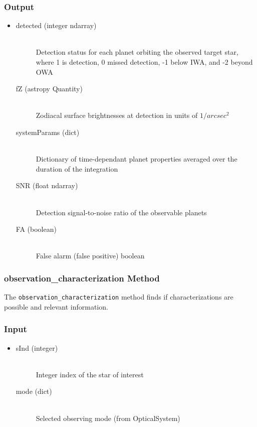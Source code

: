 \documentclass[cleanfoot]{asme2ej}
\begin{document}
\subsubsection*{Output}
\begin{itemize}
\item 
\begin{description}
    \item[detected (integer ndarray)] \hfill \\ Detection status for each planet orbiting the observed target star, where 1 is detection, 0 missed detection, -1 below IWA, and -2 beyond OWA
    \item[fZ (astropy Quantity)] \hfill \\ Zodiacal surface brightnesses at detection in units of $1/arcsec^2$
    \item[systemParams (dict)] \hfill \\ Dictionary of time-dependant planet properties averaged over the duration of the integration
    \item[SNR (float ndarray)] \hfill \\ Detection signal-to-noise ratio of the observable planets
    \item[FA (boolean)] \hfill \\ False alarm (false positive) boolean
\end{description}
\end{itemize}

\subsubsection{observation\_characterization Method} \label{sec:observationcharacterizationtask}
The \verb+observation_characterization+ method finds if characterizations are possible and relevant information.

\subsubsection*{Input}
\begin{itemize}
\item
\begin{description}
    \item[sInd (integer)] \hfill \\ Integer index of the star of interest
    \item[mode (dict)] \hfill \\ Selected observing mode (from OpticalSystem)
\end{description}
\end{itemize}
\end{document}
